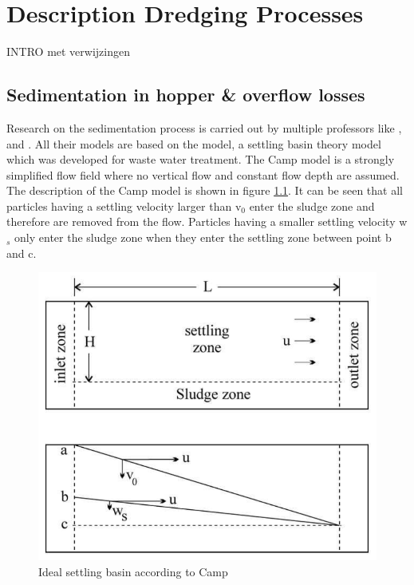 \chapter{Description Dredging Processes}

INTRO met verwijzingen


\newpage
\section{Sedimentation in hopper \& overflow losses}
\label{sec:hopper}

Research on the sedimentation process is carried out by multiple professors like \citep{Miedema_Vlasblom}, \citep{Ooijens} and \citep{Rhee}. All their models are based on the \citep{Camp} model, a settling basin theory model which was developed for waste water treatment. The Camp model is a strongly simplified flow field where no vertical flow and constant flow depth are assumed. The description of the Camp model is shown in figure \ref{fig:Camp}. It can be seen that all particles having a settling velocity larger than v$_0$ enter the sludge zone and therefore are removed from the flow. Particles having a smaller settling velocity w$_s$ only enter the sludge zone when they enter the settling zone between point b and c.

\begin{figure}[ht!]
    \centering
    \includegraphics[width=.6\linewidth]{Images/Camp.png}
    \caption{Ideal settling basin according to Camp}
    \label{fig:Camp}
\end{figure}

